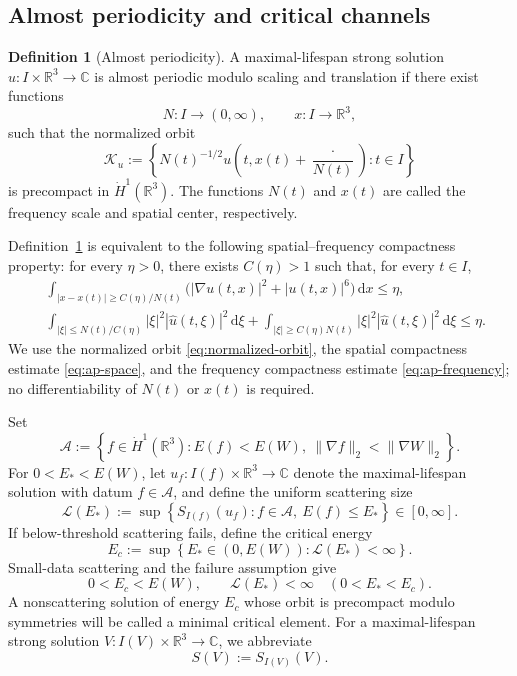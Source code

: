 \documentclass{interact}
\numberwithin{equation}{section}
\theoremstyle{plain}
\theoremstyle{definition}
\newtheorem{definition}[theorem]{Definition}
\theoremstyle{remark}
\newcommand{\R}{\mathbb R}
\newcommand{\C}{\mathbb C}
\newcommand{\dd}{\,\mathrm d}
\begin{document}
\subsection{Almost periodicity and critical channels}

\begin{definition}[Almost periodicity]\label{def:ap}
A maximal-lifespan strong solution $u:I\times\R^3\to\C$ is almost periodic modulo scaling and translation if there exist functions
\[
 N:I\to(0,\infty),
 \qquad
 x:I\to\R^3,
\]
such that the normalized orbit
\begin{equation}\label{eq:normalized-orbit}
 \mathcal K_u
 :=\left\{
 N(t)^{-1/2}u\left(t,x(t)+\frac{\cdot}{N(t)}\right):
 t\in I
 \right\}
\end{equation}
is precompact in $\dot H^1(\R^3)$. The functions $N(t)$ and $x(t)$ are called the frequency scale and spatial center, respectively.
\end{definition}

Definition~\ref{def:ap} is equivalent to the following spatial--frequency compactness property: for every $\eta>0$, there exists $C(\eta)>1$ such that, for every $t\in I$,
\begin{align}
 &\int_{|x-x(t)|\ge C(\eta)/N(t)}
 \bigl(|\nabla u(t,x)|^2+|u(t,x)|^6\bigr)\dd x
 \le\eta,
 \label{eq:ap-space}\\
 &\int_{|\xi|\le N(t)/C(\eta)}
 |\xi|^2|\widehat u(t,\xi)|^2\dd\xi
 +\int_{|\xi|\ge C(\eta)N(t)}
 |\xi|^2|\widehat u(t,\xi)|^2\dd\xi
 \le\eta.
 \label{eq:ap-frequency}
\end{align}
We use the normalized orbit \eqref{eq:normalized-orbit}, the spatial compactness estimate \eqref{eq:ap-space}, and the frequency compactness estimate \eqref{eq:ap-frequency}; no differentiability of $N(t)$ or $x(t)$ is required.

Set
\[
 \mathcal A
 :=\left\{f\in\dot H^1(\R^3):
 E(f)<E(W),\ \|\nabla f\|_2<\|\nabla W\|_2\right\}.
\]
For $0<E_*<E(W)$, let $u_f:I(f)\times\R^3\to\C$ denote the maximal-lifespan solution with datum $f\in\mathcal A$, and define the uniform scattering size
\begin{equation}\label{eq:uniform-scattering-size}
 \mathcal L(E_*)
 :=\sup\left\{
 S_{I(f)}(u_f):
 f\in\mathcal A,\ E(f)\le E_*
 \right\}\in[0,\infty].
\end{equation}
If below-threshold scattering fails, define the critical energy
\begin{equation}\label{eq:critical-energy}
 E_c
 :=\sup\left\{
 E_*\in(0,E(W)):\mathcal L(E_*)<\infty
 \right\}.
\end{equation}
Small-data scattering and the failure assumption give
\begin{equation}\label{eq:critical-energy-range}
 0<E_c<E(W),
 \qquad
 \mathcal L(E_*)<\infty\quad(0<E_*<E_c).
\end{equation}
A nonscattering solution of energy $E_c$ whose orbit is precompact modulo symmetries will be called a minimal critical element. For a maximal-lifespan strong solution $V:I(V)\times\R^3\to\C$, we abbreviate
\[
 S(V):=S_{I(V)}(V).
\]
\end{document}
